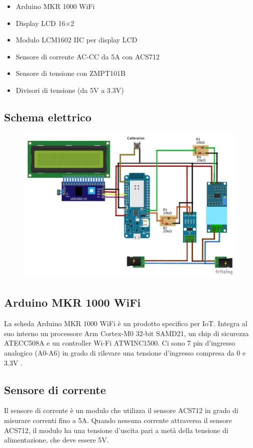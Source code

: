 \documentclass[italian,12pt,a4paper,oneside,final]{report}
\begin{document}
\begin{itemize}
\item Arduino MKR 1000 WiFi
\item Display LCD 16×2
\item Modulo LCM1602 IIC per display LCD
\item Sensore di corrente AC-CC da 5A con ACS712
\item Sensore di tensione con ZMPT101B
\item Divisori di tensione (da 5V a 3.3V)
\end{itemize}


\subsection{Schema elettrico}
\begin{figure}[h]
\includegraphics[width=\textwidth]{power_meter_bb.pdf}
\centering
\end{figure}

\subsection{Arduino MKR 1000 WiFi}
La scheda Arduino MKR 1000 WiFi è un prodotto specifico per IoT.
Integra al suo interno un processore Arm Cortex-M0 32-bit SAMD21, un chip di sicurezza ATECC508A e un controller Wi-Fi ATWINC1500.
Ci sono 7 pin d'ingresso analogico (A0-A6) in grado di rilevare una tensione d'ingresso compresa da 0 e 3.3V .

\subsection{Sensore di corrente}
Il sensore di corrente è un modulo che utilizza il sensore ACS712 in grado di misurare correnti fino a 5A.
Quando nessuna corrente attraversa il sensore ACS712, il modulo ha una tensione d'uscita pari a metà della tensione di alimentazione, che deve essere 5V.
\end{document}
